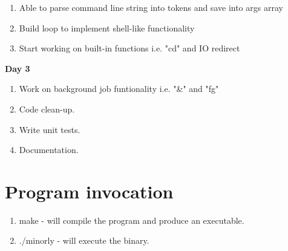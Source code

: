 \documentclass{article}
\begin{document}
\begin{enumerate}
 \item Able to parse command line string into tokens and save into args array 
 \item Build loop to implement shell-like functionality
 \item Start working on built-in functions i.e. "cd" and IO redirect
\end{enumerate}

\noindent\textbf{Day 3}

\begin{enumerate}
 \item Work on background job funtionality i.e. "\&" and "fg"
 \item Code clean-up. 
 \item Write unit tests.
 \item Documentation. 
\end{enumerate}

\section{Program invocation}

\begin{enumerate}
 \item make - will compile the program and produce an executable. 
 \item ./minorly - will execute the binary.
\end{enumerate}
\end{document}
